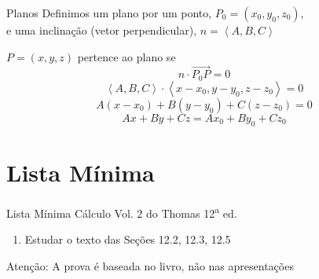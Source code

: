 \begin{frame}{Planos}
  Definimos um plano por um ponto, $P_0=(x_0, y_0, z_0)$, \\
  \pause
  e uma inclinação (vetor perpendicular), $n=\left<A, B, C\right>$

  \pause
  \vspace{\baselineskip}
  $P=(x, y, z)$ pertence ao plano se
  \[
    n\cdot \overrightarrow{P_0P} = 0
  \]
  \pause
  \[
    \left<A, B, C\right>\cdot \left<x-x_0, y-y_0, z-z_0\right> = 0
  \]
  \pause
  \[
    A(x-x_0) + B(y-y_0) + C(z-z_0) = 0
  \]
  \pause
  \[
    Ax + By + Cz = Ax_0 + By_0 + Cz_0
  \]
\end{frame}

\section{Lista Mínima}

\begin{frame}{Lista Mínima}
  Cálculo Vol. 2 do Thomas 12\textsuperscript{a} ed.
  \begin{enumerate}
    \item Estudar o texto das Seções 12.2, 12.3, 12.5
  \end{enumerate}

  \vfill
  Atenção: A prova é baseada no livro, não nas apresentações
\end{frame}


